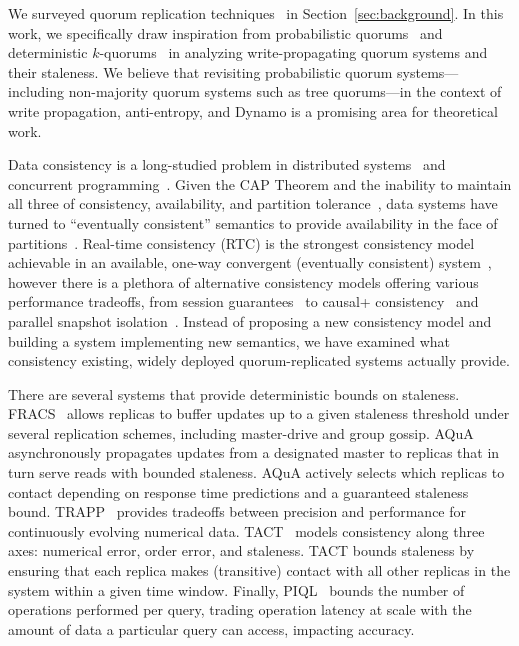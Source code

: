 \documentclass{vldb}
\begin{document}
We surveyed quorum replication
techniques~\cite{prob-quorum-dynamic, 92-quorums, treequorum, non-strict,
  multi-k-quorum, quorums-start, quorum-placement, partitionedquorum, quorums-alternative, prob-quorum,
  quorum-overview, quorumsystems} in Section~\ref{sec:background}.  In
this work, we specifically draw inspiration from probabilistic
quorums~\cite{prob-quorum} and deterministic
$k$-quorums~\cite{ non-strict, multi-k-quorum} in analyzing
write-propagating quorum systems and their staleness.  We believe that
revisiting probabilistic quorum systems---including non-majority
quorum systems such as tree quorums---in the context of write
propagation, anti-entropy, and Dynamo is a promising area for theoretical
work.

Data consistency is a long-studied problem in distributed
systems~\cite{consistency-partitioned, danger-rep} and concurrent
programming~\cite{linearizability}.  Given the CAP Theorem and the
inability to maintain all three of consistency, availability, and
partition tolerance~\cite{cap-proof}, data systems have turned to
``eventually consistent'' semantics to provide availability in the
face of partitions~\cite{consistency-partitioning, vogels-defs}.
Real-time consistency (RTC) is the strongest consistency model
achievable in an available, one-way convergent (eventually consistent)
system~\cite{rtc-proof}, however there is a plethora of alternative
consistency models offering various performance tradeoffs, from
session guarantees~\cite{sessionguarantees} to causal+
consistency~\cite{cops} and parallel snapshot isolation~\cite{walter}.
Instead of proposing a new consistency model and building a system
implementing new semantics, we have examined what consistency
existing, widely deployed quorum-replicated systems actually provide.

There are several systems that provide deterministic bounds on
staleness.  FRACS~\cite{frac} allows replicas to buffer updates up to
a given staleness threshold under several replication schemes,
including master-drive and group gossip.  AQuA~\cite{aqua}
asynchronously propagates updates from a designated master to replicas
that in turn serve reads with bounded staleness.  AQuA actively
selects which replicas to contact depending on response time
predictions and a guaranteed staleness bound.  TRAPP~\cite{trapp}
provides tradeoffs between precision and performance for continuously
evolving numerical data.  TACT~\cite{vahdat-article, vahdat-bounded}
models consistency along three axes: numerical error, order error, and
staleness.  TACT bounds staleness by ensuring that each replica makes
(transitive) contact with all other replicas in the system within a
given time window.  Finally, PIQL~\cite{piql} bounds the number of
operations performed per query, trading operation latency at scale
with the amount of data a particular query can access, impacting
accuracy.
\end{document}
